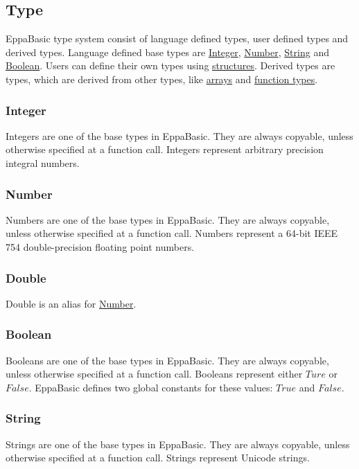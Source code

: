 \subsection{Type}
\label{type}
EppaBasic type system consist of language defined types, user defined types and derived types.
Language defined base types are \hyperref[type:Integer]{Integer},
\hyperref[type:Number]{Number}, \hyperref[type:String]{String} and \hyperref[type:Boolean]{Boolean}.
Users can define their own types using \hyperref[tld:structdef]{structures}.
Derived types are types, which are derived from other types,
like \hyperref[type:Array]{arrays} and \hyperref[type:Function]{function types}.

\subsubsection{Integer}
\label{type:Integer}
Integers are one of the base types in EppaBasic.
They are always copyable, unless otherwise specified at a function call.
Integers represent arbitrary precision integral numbers.

\subsubsection{Number}
\label{type:Number}
Numbers are one of the base types in EppaBasic.
They are always copyable, unless otherwise specified at a function call.
Numbers represent a 64-bit IEEE 754 double-precision floating point numbers.

\subsubsection{Double}
\label{type:Double}
Double is an alias for \hyperref[type:Number]{Number}.

\subsubsection{Boolean}
\label{type:Boolean}
Booleans are one of the base types in EppaBasic.
They are always copyable, unless otherwise specified at a function call.
Booleans represent either $Ture$ or $False$.
EppaBasic defines two global constants for these values: $True$ and $False$.

\subsubsection{String}
\label{type:String}
Strings are one of the base types in EppaBasic.
They are always copyable, unless otherwise specified at a function call.
Strings represent Unicode strings.

